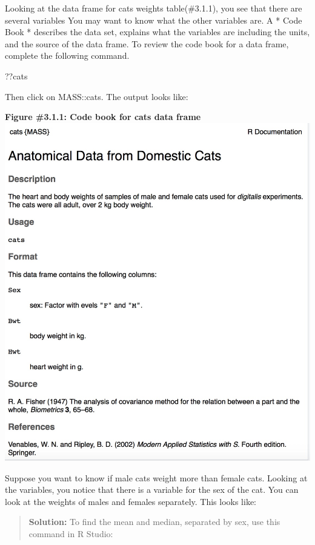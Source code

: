 \documentclass[]{book}
\newenvironment{Shaded}{\begin{snugshade}}{\end{snugshade}}
\newcommand{\NormalTok}[1]{#1}
\begin{document}
Looking at the data frame for cats weights table(\#3.1.1), you see that there are several variables You may want to know what the other variables are. A * Code Book * describes the data set, explains what the variables are including the units, and the source of the data frame.
To review the code book for a data frame, complete the following command.

\begin{Shaded}
\begin{Highlighting}[]
\NormalTok{??cats}
\end{Highlighting}
\end{Shaded}

Then click on MASS::cats.
The output looks like:

\textbf{Figure \#3.1.1: Code book for cats data frame}
\includegraphics{code_book_cats.jpeg}

Suppose you want to know if male cats weight more than female cats. Looking at the variables, you notice that there is a variable for the sex of the cat. You can look at the weights of males and females separately. This looks like:

\begin{quote}
\textbf{Solution:}
To find the mean and median, separated by sex, use this command in R Studio:
\end{quote}
\end{document}
